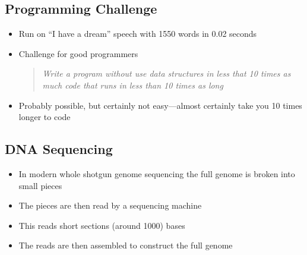 
\begin{slide}
\section{Programming Challenge}

\begin{PauseHighLight}
  \begin{itemize}
  \item Run on ``I have a dream'' speech with 1550 words in 0.02 seconds\pause
  \item Challenge for good programmers
    \begin{quote}\it
      Write a program without use data structures in less that 10 times
      as much code that runs in less than 10 times as long
    \end{quote}\pause
  \item Probably possible, but certainly not easy\pause---almost
    certainly take you 10 times longer to code\pauseb
  \end{itemize}
\end{PauseHighLight}

\end{slide}

\Outline

\begin{slide}
\section{DNA Sequencing}

\begin{PauseHighLight}
  \begin{itemize}
  \item In modern whole shotgun genome sequencing the full genome is
    broken into small pieces\pause
  \item The pieces are then read by a sequencing machine\pause
  \item This reads short sections (around 1000) bases\pause
  \item The reads are then assembled to construct the full genome\pause
  \end{itemize}
\end{PauseHighLight}

\end{slide}

